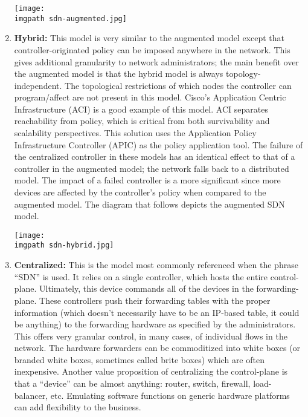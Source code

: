 \begin{enumerate}
    \begin{minipage}[t]{\linewidth}
	  \centering
      \texttt{[image: \\imgpath sdn-augmented.jpg]}
    \end{minipage}

  \item \textbf{Hybrid:} This model is very similar to the augmented model
  except that controller-originated policy can be imposed anywhere in the
  network. This gives additional granularity to network administrators; the
  main benefit over the augmented model is that the hybrid model is always
  topology-independent. The topological restrictions of which nodes the
  controller can program/affect are not present in this model. Cisco’s
  Application Centric Infrastructure (ACI) is a good example of this model.
  ACI separates reachability from policy, which is critical from both
  survivability and scalability perspectives. This solution uses the
  Application Policy Infrastructure Controller (APIC) as the policy
  application tool. The failure of the centralized controller in these models
  has an identical effect to that of a controller in the augmented model; the
  network falls back to a distributed model. The impact of a failed controller
  is a more significant since more devices are affected by the controller’s
  policy when compared to the augmented model. The diagram that follows
  depicts the augmented SDN model.

    \begin{minipage}[t]{\linewidth}
	  \centering
      \texttt{[image: \\imgpath sdn-hybrid.jpg]}
    \end{minipage}

  \item \textbf{Centralized:} This is the model most commonly referenced when
  the phrase ``SDN'' is used. It relies on a single controller, which hosts
  the entire control-plane. Ultimately, this device commands all of the
  devices in the forwarding-plane. These controllers push their forwarding
  tables with the proper information (which doesn’t necessarily have to be an
  IP-based table, it could be anything) to the forwarding hardware as
  specified by the administrators. This offers very granular control, in many
  cases, of individual flows in the network. The hardware forwarders can be
  commoditized into white boxes (or branded white boxes, sometimes called
  brite boxes) which are often inexpensive. Another value proposition of
  centralizing the control-plane is that a ``device'' can be almost anything:
  router, switch, firewall, load-balancer, etc. Emulating software functions
  on generic hardware platforms can add flexibility to the business. \\
  

\end{enumerate}
